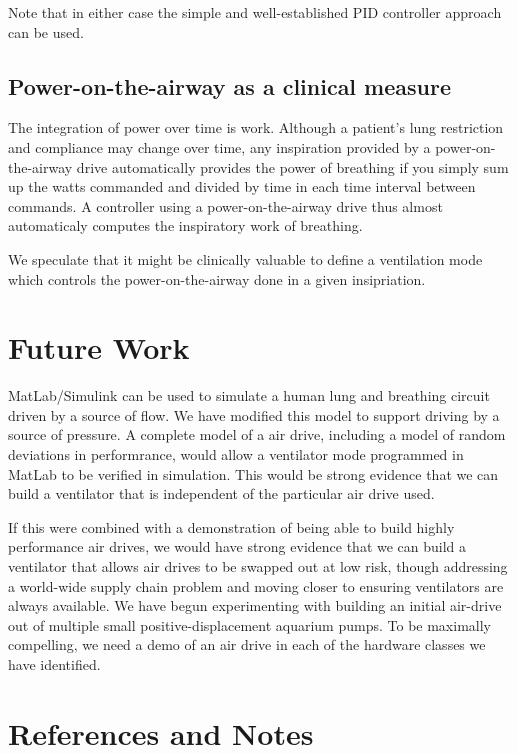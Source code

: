 \documentclass[conference]{article}
\begin{document}
Note that in either case the simple and well-established PID controller
approach can be used.

\subsection{Power-on-the-airway as a clinical measure}

The integration of power over time is work. Although a patient's
lung restriction and compliance may change over time, any inspiration
provided by a power-on-the-airway drive automatically provides
the power of breathing if you simply sum up the watts commanded
and divided by time in each time interval between commands.
A controller using a power-on-the-airway drive thus almost
automaticaly computes the inspiratory work of breathing.

We speculate that it might be clinically valuable to
define a ventilation mode which controls the power-on-the-airway
done in a given insipriation.

\section{Future Work}

MatLab/Simulink can be used to simulate a human lung and breathing circuit driven
by a source of flow\cite{mitsumlinklungmodel}.
We have modified this model to support driving by a source of pressure.
A complete model of a air drive, including a model of random deviations
in performrance, would allow a ventilator mode programmed in MatLab to be
verified in simulation. This would be strong evidence that we can build
a ventilator that is independent of the particular air drive used.

If this were combined with a demonstration of being able to build
highly performance air drives, we would have strong evidence that we
can build a ventilator that allows air drives to be swapped out at low risk,
though addressing a world-wide supply chain problem and moving closer to
ensuring ventilators are always available.
We have begun experimenting with building an initial air-drive out of
multiple small positive-displacement aquarium pumps.
To be maximally compelling,
we need a demo of an air drive in each of the hardware classes we have
identified.


\section{References and Notes}
\end{document}
